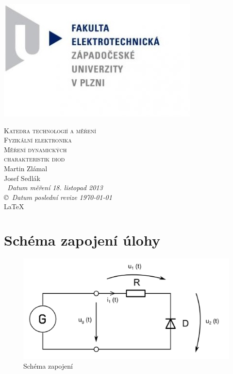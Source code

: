 \documentclass[12pt]{article} %
\newcommand{\bigsize}{\fontsize{35pt}{20pt}\selectfont}
\begin{document}
\begin{titlepage}
	\includegraphics[scale=0.7]{logo.jpg}
	\vspace*{\fill}
	\begin{center}
		\textsc{\LARGE Katedra technologií a měření}\\[0.3cm]
		\textsc{\LARGE \bigsize Fyzikální elektronika}\\[0.3cm]
		\textsc{\LARGE Měření dynamických\\charakteristik diod}\\[1cm]
		Martin Zlámal \\
		Josef Sedlák \\[1cm]
		{\small\em \ Datum měření 18. listopad 2013 } \\
		{\small\em \copyright \ Datum poslední revize \today } \\
		\LaTeX
	\end{center}
	\vspace*{\fill}
\end{titlepage}
\tableofcontents
\listoffigures
\listoftables
\newpage

\section{Schéma zapojení úlohy}
\begin{figure}[H]
\center
\includegraphics[scale=0.8]{schema.png}
\caption{Schéma zapojení}
\end{figure}
\end{document}
